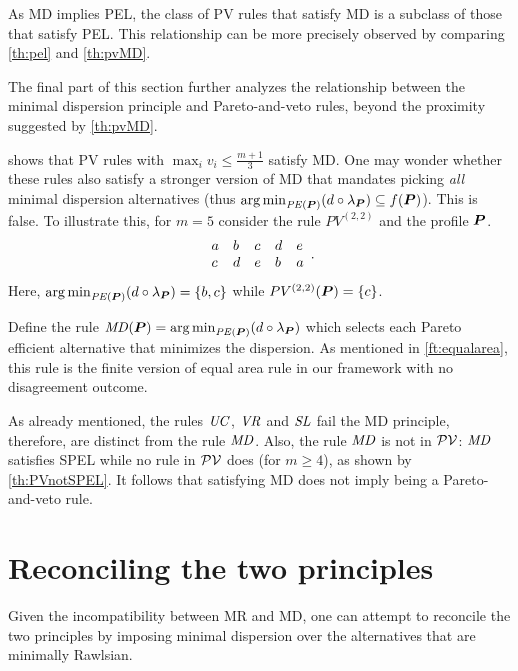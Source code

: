 \documentclass[version=3.21, pagesize, twoside=off, bibliography=totoc, DIV=calc, fontsize=12pt, a4paper]{scrartcl}
\begin{document}
\begin{remark}
   As MD implies PEL, the class of PV rules that satisfy MD is a subclass of those that satisfy PEL. This relationship can be more precisely observed by comparing \cref{th:pel} and \cref{th:pvMD}. 
\end{remark}

The final part of this section further analyzes the relationship between the minimal dispersion principle and Pareto-and-veto rules, beyond the proximity suggested by \cref{th:pvMD}. 

\begin{remark}
	 shows that PV rules with $\max_i v_i ≤ \frac{m + 1}{3}$ satisfy MD. One may wonder whether these rules also satisfy a stronger version of MD that mandates picking \emph{all} minimal dispersion alternatives (thus $\argmin_{\PE} (d \circ \lprof) \subseteq f(\prof)$). This is false. To illustrate this, for $m = 5$ consider the rule $PV^{(2, 2)}$ and the profile $\bm{P}$.
	\begin{equation}
		\begin{array}{*5{l}}
			a& b & c & d & e \\
			c& d & e & b & a\\
		\end{array}.
	\end{equation}
	Here, $\argmin_{\PE} (d \circ \lprof) = \set{b, c}$ while $PV^{(2, 2)}(\bm{P}) = \{c\}$.
\end{remark}

Define the rule $\MD(\prof) = \argmin_{\PE}(d \circ \lprof)$ which selects each Pareto efficient alternative that minimizes the dispersion. As mentioned in \cref{ft:equalarea}, this rule is the finite version of  equal area rule in our framework with no disagreement outcome. 

\begin{remark}
	As already mentioned, the rules $\mathit{UC}$, $\mathit{VR}$ and $\mathit{SL}$ fail the MD principle, therefore, are distinct from the rule $\mathit{MD}$. Also,
the rule $\mathit{MD}$ is not in $\mathcal{PV}$: $\mathit{MD}$ satisfies SPEL while no rule in $\mathcal{PV}$ does (for $m ≥ 4$), as shown by \cref{th:PVnotSPEL}.
	It follows that satisfying MD does not imply being a Pareto-and-veto rule.
\end{remark}

\section{Reconciling the two principles}
\label{sec:reconc}
Given the incompatibility between MR and MD, one can attempt to reconcile the two principles by imposing minimal dispersion over the alternatives that are minimally Rawlsian. 
\end{document}
